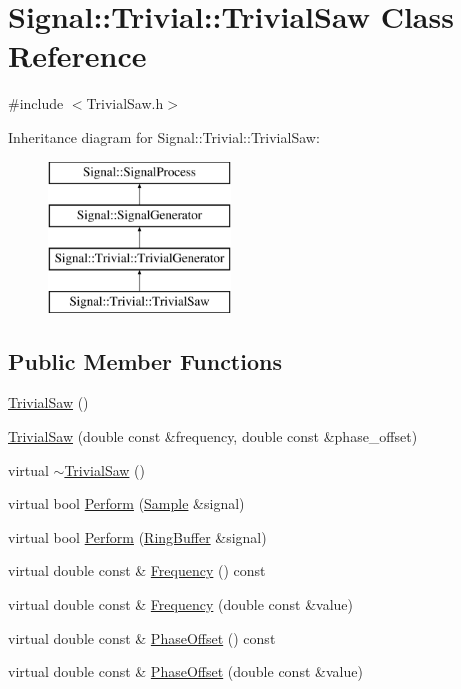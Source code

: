 \hypertarget{classSignal_1_1Trivial_1_1TrivialSaw}{\section{Signal\+:\+:Trivial\+:\+:Trivial\+Saw Class Reference}
\label{classSignal_1_1Trivial_1_1TrivialSaw}
}


{\ttfamily \#include $<$Trivial\+Saw.\+h$>$}

Inheritance diagram for Signal\+:\+:Trivial\+:\+:Trivial\+Saw\+:\begin{figure}[H]
\begin{center}
\leavevmode
\includegraphics[height=4.000000cm]{classSignal_1_1Trivial_1_1TrivialSaw}
\end{center}
\end{figure}
\subsection*{Public Member Functions}
\begin{DoxyCompactItemize}
\item 
\hyperlink{classSignal_1_1Trivial_1_1TrivialSaw_ab275dfc3c1744233119a78d1f1f61635}{Trivial\+Saw} ()
\item 
\hyperlink{classSignal_1_1Trivial_1_1TrivialSaw_acbe13c1345165bd3fd7ab746a07aab55}{Trivial\+Saw} (double const \&frequency, double const \&phase\+\_\+offset)
\item 
virtual \hyperlink{classSignal_1_1Trivial_1_1TrivialSaw_a9676d4e1fd7b2c1a8c70c87e1dd8418a}{$\sim$\+Trivial\+Saw} ()
\item 
virtual bool \hyperlink{classSignal_1_1Trivial_1_1TrivialSaw_a091e3137a03978cc7dfaecf5b00dad46}{Perform} (\hyperlink{classSignal_1_1Sample}{Sample} \&signal)
\item 
virtual bool \hyperlink{classSignal_1_1Trivial_1_1TrivialSaw_a22b97c8dfdca76664cbb6e634c85085d}{Perform} (\hyperlink{classSignal_1_1RingBuffer}{Ring\+Buffer} \&signal)
\item 
virtual double const \& \hyperlink{classSignal_1_1SignalGenerator_a96af42ee68f94e9b04d034fd68b73ecd}{Frequency} () const 
\item 
virtual double const \& \hyperlink{classSignal_1_1SignalGenerator_af83b532bf3ddc3637c2fd7a1dfd095cb}{Frequency} (double const \&value)
\item 
virtual double const \& \hyperlink{classSignal_1_1SignalGenerator_ac2538ec946f001e394d2416fda698d1c}{Phase\+Offset} () const 
\item 
virtual double const \& \hyperlink{classSignal_1_1SignalGenerator_ac6a103ff72beaa338f6d18c812522d78}{Phase\+Offset} (double const \&value)
\end{DoxyCompactItemize}
